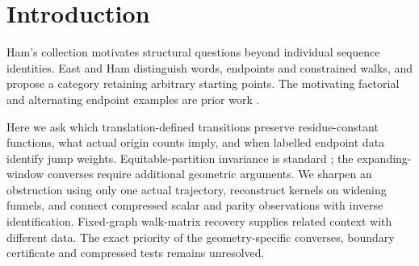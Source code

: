 \section{Introduction}
Ham's collection \cite{Ham2019} motivates structural questions beyond individual sequence identities. East and Ham \cite{EastHam} distinguish words, endpoints and constrained walks, and propose a category retaining arbitrary starting points. The motivating factorial and alternating endpoint examples are prior work \cite[Example 3.14]{EastHamV1}.

Here we ask which translation-defined transitions preserve residue-constant functions, what actual origin counts imply, and when labelled endpoint data identify jump weights. Equitable-partition invariance is standard \cite{BaileyEtAl}; the expanding-window converses require additional geometric arguments. We sharpen an obstruction using only one actual trajectory, reconstruct kernels on widening funnels, and connect compressed scalar and parity observations with inverse identification. Fixed-graph walk-matrix recovery \cite{LiuSiemons} supplies related context with different data. The exact priority of the geometry-specific converses, boundary certificate and compressed tests remains unresolved.
